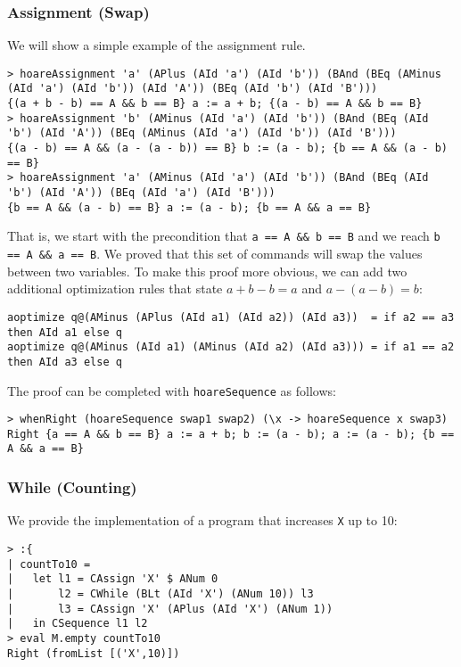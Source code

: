 \documentclass{article}
\begin{document}
\subsubsection{Assignment (Swap)}

We will show a simple example of the assignment rule.

\begin{lstlisting}
> hoareAssignment 'a' (APlus (AId 'a') (AId 'b')) (BAnd (BEq (AMinus (AId 'a') (AId 'b')) (AId 'A')) (BEq (AId 'b') (AId 'B')))
{(a + b - b) == A && b == B} a := a + b; {(a - b) == A && b == B}
> hoareAssignment 'b' (AMinus (AId 'a') (AId 'b')) (BAnd (BEq (AId 'b') (AId 'A')) (BEq (AMinus (AId 'a') (AId 'b')) (AId 'B')))
{(a - b) == A && (a - (a - b)) == B} b := (a - b); {b == A && (a - b) == B}
> hoareAssignment 'a' (AMinus (AId 'a') (AId 'b')) (BAnd (BEq (AId 'b') (AId 'A')) (BEq (AId 'a') (AId 'B')))
{b == A && (a - b) == B} a := (a - b); {b == A && a == B}
\end{lstlisting}

That is, we start with the precondition that \texttt{a == A \&\& b == B} and we reach \texttt{b == A \&\& a == B}. We proved that this set of commands will swap the values between two variables. To make this proof more obvious, we can add two additional optimization rules that state $a + b - b = a$ and $a - (a - b) = b$:

\begin{lstlisting}
aoptimize q@(AMinus (APlus (AId a1) (AId a2)) (AId a3))  = if a2 == a3 then AId a1 else q
aoptimize q@(AMinus (AId a1) (AMinus (AId a2) (AId a3))) = if a1 == a2 then AId a3 else q
\end{lstlisting}

The proof can be completed with \texttt{hoareSequence} as follows:

\begin{lstlisting}
> whenRight (hoareSequence swap1 swap2) (\x -> hoareSequence x swap3)
Right {a == A && b == B} a := a + b; b := (a - b); a := (a - b); {b == A && a == B}
\end{lstlisting}

\subsubsection{While (Counting)}

We provide the implementation of a program that increases \texttt{X} up to 10:

\begin{lstlisting}
> :{
| countTo10 =
|   let l1 = CAssign 'X' $ ANum 0
|       l2 = CWhile (BLt (AId 'X') (ANum 10)) l3
|       l3 = CAssign 'X' (APlus (AId 'X') (ANum 1))
|   in CSequence l1 l2
> eval M.empty countTo10
Right (fromList [('X',10)])
\end{lstlisting}
\end{document}
